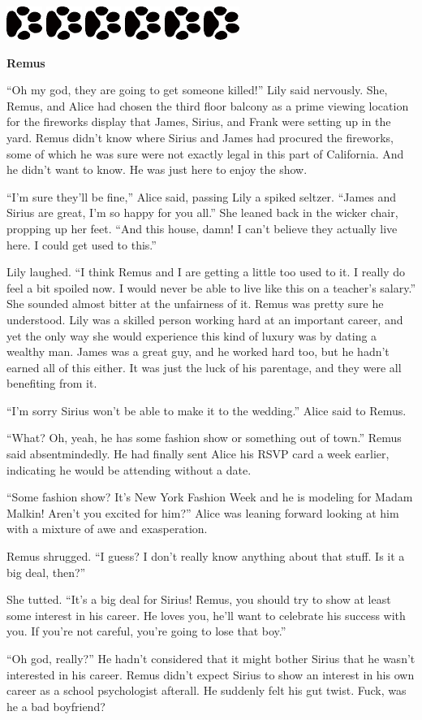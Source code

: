 \documentclass[12pt,twoside,openright]{memoir}
\newcommand{\dogPrintRule}{	
	\begin{center}
		\hspace{.5em}
		\includegraphics[angle=60]{dogprint.pdf}
		\hspace{.5em}
		\includegraphics[angle=120]{dogprint.pdf}
		\hspace{.5em}
		\includegraphics[angle=60]{dogprint.pdf}
		\hspace{.5em}
		\includegraphics[angle=120]{dogprint.pdf}
		\hspace{.5em}
		\includegraphics[angle=60]{dogprint.pdf}
		\hspace{.5em}
		\includegraphics[angle=120]{dogprint.pdf}
		\hspace{.5em}
	\end{center}
}
\begin{document}
\dogPrintRule

\textbf{Remus} 

``Oh my god, they are going to get someone killed!'' Lily said nervously. She, Remus, and Alice had chosen the third floor balcony as a prime viewing location for the fireworks display that James, Sirius, and Frank were setting up in the yard. Remus didn't know where Sirius and James had procured the fireworks, some of which he was sure were not exactly legal in this part of California. And he didn't want to know. He was just here to enjoy the show. 

``I'm sure they'll be fine,'' Alice said, passing Lily a spiked seltzer. ``James and Sirius are great, I'm so happy for you all.'' She leaned back in the wicker chair, propping up her feet. ``And this house, damn! I can't believe they actually live here. I could get used to this.''

Lily laughed. ``I think Remus and I are getting a little too used to it. I really do feel a bit spoiled now. I would never be able to live like this on a teacher's salary.'' She sounded almost bitter at the unfairness of it. Remus was pretty sure he understood. Lily was a skilled person working hard at an important career, and yet the only way she would experience this kind of luxury was by dating a wealthy man. James was a great guy, and he worked hard too, but he hadn't earned all of this either. It was just the luck of his parentage, and they were all benefiting from it.

``I'm sorry Sirius won't be able to make it to the wedding.'' Alice said to Remus. 

``What? Oh, yeah, he has some fashion show or something out of town.'' Remus said absentmindedly. He had finally sent Alice his RSVP card a week earlier, indicating he would be attending without a date. 

``Some fashion show? It's New York Fashion Week and he is modeling for Madam Malkin! Aren't you excited for him?'' Alice was leaning forward looking at him with a mixture of awe and exasperation.

Remus shrugged. ``I guess? I don't really know anything about that stuff. Is it a big deal, then?''

She tutted. ``It's a big deal for Sirius! Remus, you should try to show at least some interest in his career. He loves you, he'll want to celebrate his success with you. If you're not careful, you're going to lose that boy.''

``Oh god, really?'' He hadn't considered that it might bother Sirius that he wasn't interested in his career. Remus didn't expect Sirius to show an interest in his own career as a school psychologist afterall. He suddenly felt his gut twist. Fuck, was he a bad boyfriend?
\end{document}
